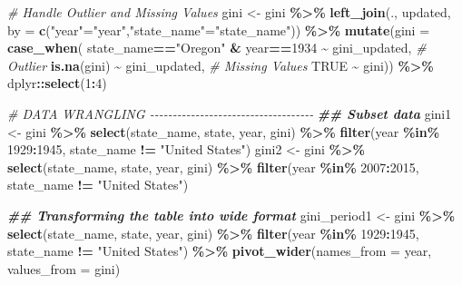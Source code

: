 \documentclass[11pt,a4paper,]{article}
\newenvironment{Shaded}{\begin{snugshade}}{\end{snugshade}}
\newcommand{\AttributeTok}[1]{\textcolor[rgb]{0.13,0.29,0.53}{#1}}
\newcommand{\CommentTok}[1]{\textcolor[rgb]{0.56,0.35,0.01}{\textit{#1}}}
\newcommand{\ConstantTok}[1]{\textcolor[rgb]{0.56,0.35,0.01}{#1}}
\newcommand{\DecValTok}[1]{\textcolor[rgb]{0.00,0.00,0.81}{#1}}
\newcommand{\DocumentationTok}[1]{\textcolor[rgb]{0.56,0.35,0.01}{\textbf{\textit{#1}}}}
\newcommand{\FunctionTok}[1]{\textcolor[rgb]{0.13,0.29,0.53}{\textbf{#1}}}
\newcommand{\NormalTok}[1]{#1}
\newcommand{\OtherTok}[1]{\textcolor[rgb]{0.56,0.35,0.01}{#1}}
\newcommand{\SpecialCharTok}[1]{\textcolor[rgb]{0.81,0.36,0.00}{\textbf{#1}}}
\newcommand{\StringTok}[1]{\textcolor[rgb]{0.31,0.60,0.02}{#1}}
\begin{document}
\begin{Shaded}
\begin{Highlighting}[]
\CommentTok{\# Handle Outlier and Missing Values}
\NormalTok{gini }\OtherTok{\textless{}{-}}\NormalTok{ gini }\SpecialCharTok{\%\textgreater{}\%} 
  \FunctionTok{left\_join}\NormalTok{(., updated, }\AttributeTok{by =} \FunctionTok{c}\NormalTok{(}\StringTok{"year"}\OtherTok{=}\StringTok{"year"}\NormalTok{,}\StringTok{"state\_name"}\OtherTok{=}\StringTok{"state\_name"}\NormalTok{)) }\SpecialCharTok{\%\textgreater{}\%} 
  \FunctionTok{mutate}\NormalTok{(}\AttributeTok{gini =} \FunctionTok{case\_when}\NormalTok{(}
\NormalTok{    state\_name}\SpecialCharTok{==}\StringTok{"Oregon"} \SpecialCharTok{\&}\NormalTok{ year}\SpecialCharTok{==}\DecValTok{1934} \SpecialCharTok{\textasciitilde{}}\NormalTok{ gini\_updated, }\CommentTok{\# Outlier}
    \FunctionTok{is.na}\NormalTok{(gini) }\SpecialCharTok{\textasciitilde{}}\NormalTok{ gini\_updated,                       }\CommentTok{\# Missing Values}
    \ConstantTok{TRUE} \SpecialCharTok{\textasciitilde{}}\NormalTok{ gini)) }\SpecialCharTok{\%\textgreater{}\%} 
\NormalTok{  dplyr}\SpecialCharTok{::}\FunctionTok{select}\NormalTok{(}\DecValTok{1}\SpecialCharTok{:}\DecValTok{4}\NormalTok{)}

\CommentTok{\# DATA WRANGLING {-}{-}{-}{-}{-}{-}{-}{-}{-}{-}{-}{-}{-}{-}{-}{-}{-}{-}{-}{-}{-}{-}{-}{-}{-}{-}{-}{-}{-}{-}{-}{-}{-}{-}{-}{-}}
\DocumentationTok{\#\# Subset data}
\NormalTok{gini1 }\OtherTok{\textless{}{-}}\NormalTok{ gini }\SpecialCharTok{\%\textgreater{}\%}
  \FunctionTok{select}\NormalTok{(state\_name, state, year, gini) }\SpecialCharTok{\%\textgreater{}\%}
  \FunctionTok{filter}\NormalTok{(year }\SpecialCharTok{\%in\%} \DecValTok{1929}\SpecialCharTok{:}\DecValTok{1945}\NormalTok{,}
\NormalTok{         state\_name }\SpecialCharTok{!=} \StringTok{"United States"}\NormalTok{)}
\NormalTok{gini2 }\OtherTok{\textless{}{-}}\NormalTok{ gini }\SpecialCharTok{\%\textgreater{}\%}
  \FunctionTok{select}\NormalTok{(state\_name, state, year, gini) }\SpecialCharTok{\%\textgreater{}\%}
  \FunctionTok{filter}\NormalTok{(year }\SpecialCharTok{\%in\%} \DecValTok{2007}\SpecialCharTok{:}\DecValTok{2015}\NormalTok{,}
\NormalTok{         state\_name }\SpecialCharTok{!=} \StringTok{"United States"}\NormalTok{)}

\DocumentationTok{\#\# Transforming the table into wide format}
\NormalTok{gini\_period1 }\OtherTok{\textless{}{-}}\NormalTok{ gini }\SpecialCharTok{\%\textgreater{}\%}
  \FunctionTok{select}\NormalTok{(state\_name, state, year, gini) }\SpecialCharTok{\%\textgreater{}\%}
  \FunctionTok{filter}\NormalTok{(year }\SpecialCharTok{\%in\%} \DecValTok{1929}\SpecialCharTok{:}\DecValTok{1945}\NormalTok{,}
\NormalTok{         state\_name }\SpecialCharTok{!=} \StringTok{"United States"}\NormalTok{) }\SpecialCharTok{\%\textgreater{}\%}
  \FunctionTok{pivot\_wider}\NormalTok{(}\AttributeTok{names\_from =}\NormalTok{ year,}
              \AttributeTok{values\_from =}\NormalTok{ gini)}


\end{Highlighting}
\end{Shaded}
\end{document}
